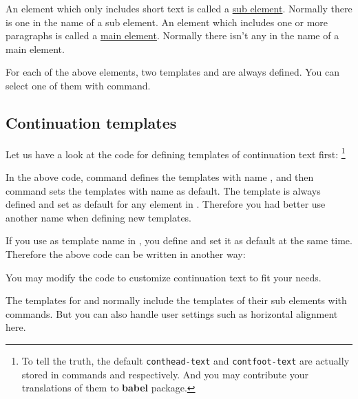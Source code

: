 \documentclass[oneside]{book}
\begin{document}
An element which only includes short text is called a \underline{sub element}.
Normally there is one \TT{-} in the name of a sub element.
An element which includes one or more paragraphs is called a \underline{main element}.
Normally there isn't any \TT{-} in the name of a main element.

For each of the above elements, two templates  and  are always defined.
You can select one of them with \CC{\SetTblrTemplate} command.

\subsection{Continuation templates}

Let us have a look at the code for defining templates of continuation text first:%
\footnote{To tell the truth, the default \texttt{conthead-text} and \texttt{contfoot-text}
are actually stored in commands \texttt{\string\tblrcontheadname} and \texttt{\string\tblrcontfootname}
respectively. And you may contribute your translations of them to \textbf{babel} package.}

\begin{codehigh}
\end{codehigh}

In the above code, command \CC{\DeclareTblrTemplate} defines the templates with name ,
and then command \CC{\SetTblrTemplate} sets the templates with name  as default.
The  template is always defined and set as default for any element in .
Therefore you had better use another name when defining new templates.

If you use  as template name in \CC{\DeclareTblrTemplate},
you define and set it as default at the same time.
Therefore the above code can be written in another way:

\begin{codehigh}
\end{codehigh}

You may modify the code to customize continuation text to fit your needs.

The templates for  and  normally
include the templates of their sub elements with \CC{\UseTblrTemplate} commands.
But you can also handle user settings such as horizontal alignment here.
\end{document}
